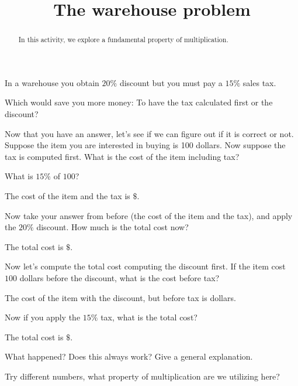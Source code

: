 \documentclass{ximera}
\title{The warehouse problem}
\begin{document}
\begin{abstract}
In this activity, we explore a fundamental property of multiplication. 
\end{abstract}
\maketitle

\begin{question}
In a warehouse you obtain $20\%$ discount but you must pay a $15\%$
sales tax. 


 Which would save you more money: To have the tax calculated
  first or the discount?
\begin{solution}
\begin{multiple-choice}
\end{multiple-choice}
\end{solution}
Now that you have an answer, let's see if we can figure out if it is
correct or not. Suppose the item you are interested in buying is 100
dollars. Now suppose the tax is computed first. What is the cost of
the item including tax?
\begin{solution}
\begin{hint}
What is $15\%$ of $100$?  
\end{hint}
The cost of the item and the tax is
\(\$\).
\end{solution}
 Now take your answer from before (the cost of the item and the tax),
and apply the $20\%$ discount. How much is the total cost now?
\begin{solution}
The total cost is \(\$\). 
\end{solution}
 Now let's compute the total cost computing the discount first. If the
item cost $100$ dollars before the discount, what is the cost before tax?
\begin{solution}
The cost of the item with the discount, but before tax is  dollars. 
\end{solution}
 Now if you apply the $15\%$ tax, what is the total cost?
\begin{solution}
The total cost is \(\$\).
\end{solution} 
 What happened? Does this always work? Give a general explanation.
\begin{free-response}
Try different numbers, what property of multiplication are we
utilizing here?
\end{free-response}

\end{question}
\end{document}
